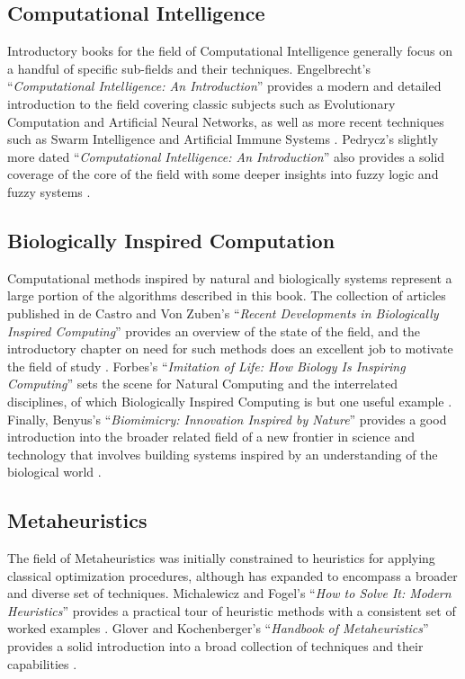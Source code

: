 \begin{bibunit}
% 
% 
\subsection{Computational Intelligence}
Introductory books for the field of Computational Intelligence generally focus on a handful of specific sub-fields and their techniques. Engelbrecht's ``\emph{Computational Intelligence: An Introduction}'' provides a modern and detailed introduction to the field covering classic subjects such as Evolutionary Computation and Artificial Neural Networks, as well as more recent techniques such as Swarm Intelligence and Artificial Immune Systems \cite{Engelbrecht2007}. Pedrycz's slightly more dated ``\emph{Computational Intelligence: An Introduction}'' also provides a solid coverage of the core of the field with some deeper insights into fuzzy logic and fuzzy systems \cite{Pedrycz1997}.

% 
% 
\subsection{Biologically Inspired Computation}
Computational methods inspired by natural and biologically systems represent a large portion of the algorithms described in this book. The collection of articles published in de Castro and Von Zuben's ``\emph{Recent Developments in Biologically Inspired Computing}'' provides an overview of the state of the field, and the introductory chapter on need for such methods does an excellent job to motivate the field of study \cite{Castro2005}. Forbes's ``\emph{Imitation of Life: How Biology Is Inspiring Computing}'' sets the scene for Natural Computing and the interrelated disciplines, of which Biologically Inspired Computing is but one useful example \cite{Forbes2000}. Finally, Benyus's ``\emph{Biomimicry: Innovation Inspired by Nature}'' provides a good introduction into the broader related field of a new frontier in science and technology that involves building systems inspired by an understanding of the biological world \cite{Benyus1998}.

% 
% 
\subsection{Metaheuristics}
The field of Metaheuristics was initially constrained to heuristics for applying classical optimization procedures, although has expanded to encompass a broader and diverse set of techniques. Michalewicz and Fogel's ``\emph{How to Solve It: Modern Heuristics}'' provides a practical tour of heuristic methods with a consistent set of worked examples \cite{Michalewicz2004}. Glover and Kochenberger's ``\emph{Handbook of Metaheuristics}'' provides a solid introduction into a broad collection of techniques and their capabilities \cite{Glover2003}.


\end{bibunit}
